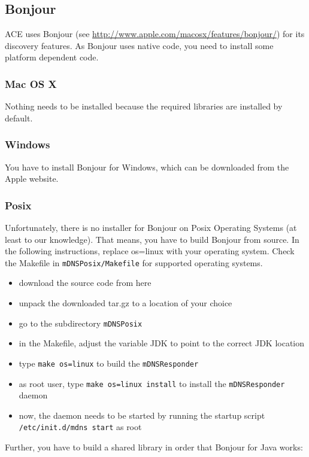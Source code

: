 \documentclass[11pt,a4paper]{article}
\begin{document}
\subsection{Bonjour}
ACE uses Bonjour (see \href{http://www.apple.com/macosx/features/bonjour/}{http://www.apple.com/macosx/features/bonjour/}) for its discovery features.
As Bonjour uses native code, you need to install some platform 
dependent code.

\subsubsection{Mac OS X}
Nothing needs to be installed because the required libraries are installed
by default.

\subsubsection{Windows}
You have to install Bonjour for Windows, which can be downloaded from the Apple website.

\subsubsection{Posix}
Unfortunately, there is no installer for Bonjour on Posix Operating Systems
(at least to our knowledge).
That means, you have to build Bonjour from source. In the following instructions, replace os=linux with your operating system. Check the Makefile in \texttt{mDNSPosix/Makefile} for supported operating systems.

\begin{itemize}
 \item download the source code from here
 \item unpack the downloaded tar.gz to a location of your choice
 \item go to the subdirectory \texttt{mDNSPosix}
 \item in the Makefile, adjust the variable JDK to point to the correct JDK location
 \item type \texttt{make os=linux} to build the \texttt{mDNSResponder}
 \item as root user, type \texttt{make os=linux install} to install the \texttt{mDNSResponder} daemon
 \item now, the daemon needs to be started by running the startup script \texttt{/etc/init.d/mdns start} as root
\end{itemize}

Further, you have to build a shared library in order that Bonjour for Java works:
\end{document}
